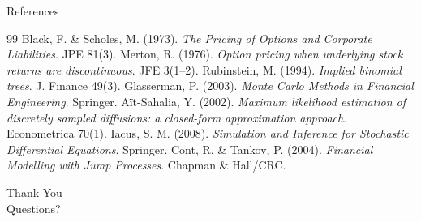 \documentclass[aspectratio=169,10pt]{beamer}
\begin{document}
\begin{frame}{References}
  \footnotesize
  \begin{thebibliography}{99}
     Black, F. \& Scholes, M. (1973). \emph{The Pricing of Options and Corporate Liabilities}. JPE 81(3).
     Merton, R. (1976). \emph{Option pricing when underlying stock returns are discontinuous}. JFE 3(1--2).
     Rubinstein, M. (1994). \emph{Implied binomial trees}. J. Finance 49(3).
     Glasserman, P. (2003). \emph{Monte Carlo Methods in Financial Engineering}. Springer.
     A\"it-Sahalia, Y. (2002). \emph{Maximum likelihood estimation of discretely sampled diffusions: a closed-form approximation approach}. Econometrica 70(1).
     Iacus, S. M. (2008). \emph{Simulation and Inference for Stochastic Differential Equations}. Springer.
     Cont, R. \& Tankov, P. (2004). \emph{Financial Modelling with Jump Processes}. Chapman \& Hall/CRC.
  \end{thebibliography}
\end{frame}

\begin{frame}
  \centering
  \Huge Thank You\\[0.6em]
  \Large Questions?
\end{frame}
\end{document}
